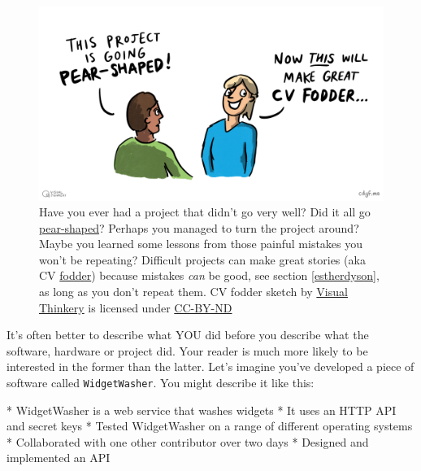 \documentclass[
]{book}
\newenvironment{Shaded}{\begin{snugshade}}{\end{snugshade}}
\newcommand{\NormalTok}[1]{#1}
\newcommand{\SpecialStringTok}[1]{\textcolor[rgb]{0.31,0.60,0.02}{#1}}
\begin{document}
\begin{figure}

{\centering \includegraphics[width=0.98\linewidth]{images/CV Fodder} 

}

\caption{Have you ever had a project that didn't go very well? Did it all go \href{https://en.wikipedia.org/wiki/Pear-shaped}{pear-shaped}? Perhaps you managed to turn the project around? Maybe you learned some lessons from those painful mistakes you won't be repeating? Difficult projects can make great stories (aka CV \href{https://en.wikipedia.org/wiki/Fodder}{fodder}) because mistakes \emph{can} be good, see section \ref{estherdyson}, as long as you don't repeat them. CV fodder sketch by \href{https://visualthinkery.com/}{Visual Thinkery} is licensed under \href{https://creativecommons.org/licenses/by-nd/4.0/}{CC-BY-ND}}\label{fig:cvfodder-fig}
\end{figure}



It's often better to describe what YOU did before you describe what the software, hardware or project did. Your reader is much more likely to be interested in the former than the latter. Let's imagine you've developed a piece of software called \texttt{WidgetWasher}. You might describe it like this:

\begin{Shaded}
\begin{Highlighting}[]
\SpecialStringTok{* }\NormalTok{WidgetWasher is a web service that washes widgets}
\SpecialStringTok{* }\NormalTok{It uses an HTTP API and secret keys}
\SpecialStringTok{* }\NormalTok{Tested WidgetWasher on a range of different operating systems}
\SpecialStringTok{* }\NormalTok{Collaborated with one other contributor over two days}
\SpecialStringTok{* }\NormalTok{Designed and implemented an API}
\end{Highlighting}
\end{Shaded}
\end{document}
